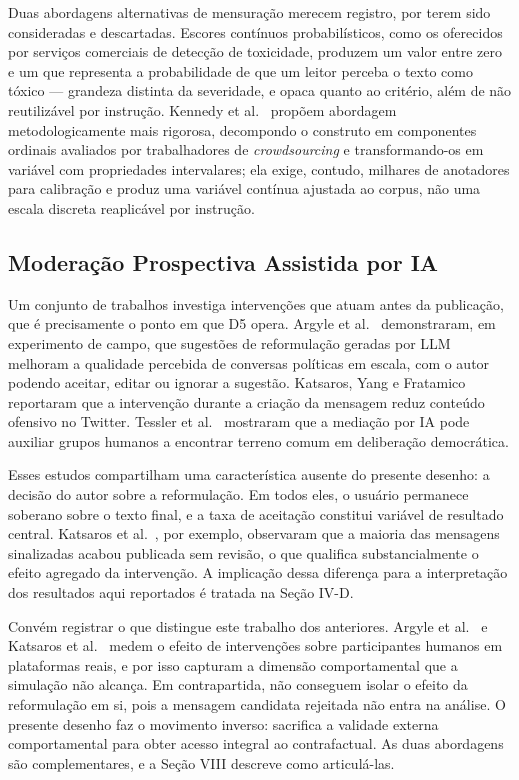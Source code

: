 \documentclass[conference]{IEEEtran} \IEEEoverridecommandlockouts %
\begin{document}
Duas abordagens alternativas de mensuração merecem registro, por terem sido
consideradas e descartadas. Escores contínuos probabilísticos, como os
oferecidos por serviços comerciais de detecção de toxicidade, produzem um valor
entre zero e um que representa a probabilidade de que um leitor perceba o texto
como tóxico — grandeza distinta da severidade, e opaca quanto ao critério, além
de não reutilizável por instrução. Kennedy et al.~\cite{kennedy2020constructing}
propõem abordagem metodologicamente mais rigorosa, decompondo o construto em
componentes ordinais avaliados por trabalhadores de \textit{crowdsourcing} e
transformando-os em variável com propriedades intervalares; ela exige, contudo,
milhares de anotadores para calibração e produz uma variável contínua ajustada
ao corpus, não uma escala discreta reaplicável por instrução.

\subsection{Moderação Prospectiva Assistida por IA}

Um conjunto de trabalhos investiga intervenções que atuam antes da publicação,
que é precisamente o ponto em que D5 opera. Argyle et
al.~\cite{argyle2023leveraging} demonstraram, em experimento de campo, que
sugestões de reformulação geradas por LLM melhoram a qualidade percebida de
conversas políticas em escala, com o autor podendo aceitar, editar ou ignorar a
sugestão. Katsaros, Yang e Fratamico~\cite{katsaros2022reconsidering}
reportaram que a intervenção durante a criação da mensagem reduz conteúdo
ofensivo no Twitter. Tessler et al.~\cite{tessler2024ai} mostraram que a
mediação por IA pode auxiliar grupos humanos a encontrar terreno comum em
deliberação democrática.

Esses estudos compartilham uma característica ausente do presente desenho: a
decisão do autor sobre a reformulação. Em todos eles, o usuário permanece
soberano sobre o texto final, e a taxa de aceitação constitui variável de
resultado central. Katsaros et al.~\cite{katsaros2022reconsidering}, por
exemplo, observaram que a maioria das mensagens sinalizadas acabou publicada
sem revisão, o que qualifica substancialmente o efeito agregado da
intervenção. A implicação dessa diferença para a interpretação dos resultados
aqui reportados é tratada na Seção IV-D.

Convém registrar o que distingue este trabalho dos anteriores. Argyle et
al.~\cite{argyle2023leveraging} e Katsaros et
al.~\cite{katsaros2022reconsidering} medem o efeito de intervenções sobre
participantes humanos em plataformas reais, e por isso capturam a dimensão
comportamental que a simulação não alcança. Em contrapartida, não conseguem
isolar o efeito da reformulação em si, pois a mensagem candidata rejeitada não
entra na análise. O presente desenho faz o movimento inverso: sacrifica a
validade externa comportamental para obter acesso integral ao contrafactual.
As duas abordagens são complementares, e a Seção VIII descreve como articulá-las.
\end{document}
